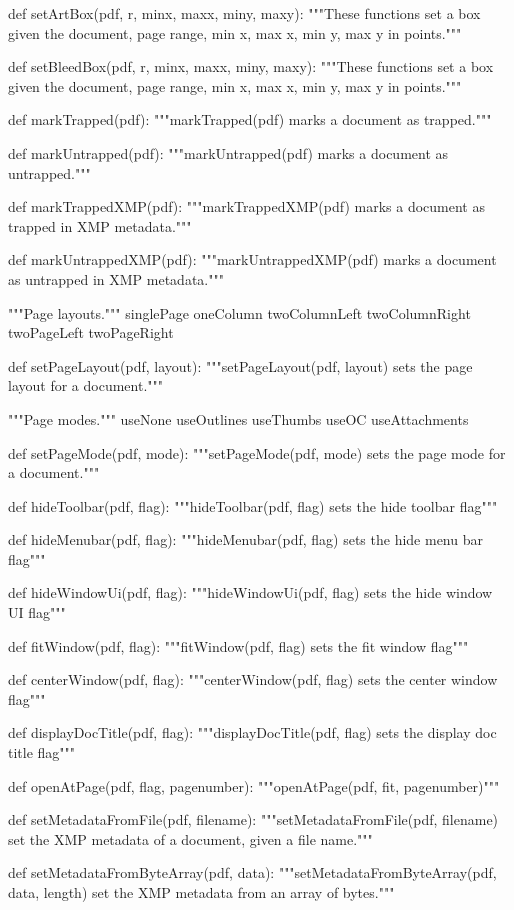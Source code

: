 def setArtBox(pdf, r, minx, maxx, miny, maxy):
    """These functions set a box given the document, page range, min x, max x,
    min y, max y in points."""

def setBleedBox(pdf, r, minx, maxx, miny, maxy):
    """These functions set a box given the document, page range, min x, max x,
    min y, max y in points."""

def markTrapped(pdf):
    """markTrapped(pdf) marks a document as trapped."""

def markUntrapped(pdf):
    """markUntrapped(pdf) marks a document as untrapped."""

def markTrappedXMP(pdf):
    """markTrappedXMP(pdf) marks a document as trapped in XMP metadata."""

def markUntrappedXMP(pdf):
    """markUntrappedXMP(pdf) marks a document as untrapped in XMP metadata."""

"""Page layouts."""
singlePage
oneColumn
twoColumnLeft
twoColumnRight
twoPageLeft
twoPageRight

def setPageLayout(pdf, layout):
    """setPageLayout(pdf, layout) sets the page layout for a document."""

"""Page modes."""
useNone
useOutlines
useThumbs
useOC
useAttachments


def setPageMode(pdf, mode):
    """setPageMode(pdf, mode) sets the page mode for a document."""

def hideToolbar(pdf, flag):
    """hideToolbar(pdf, flag) sets the hide toolbar flag"""

def hideMenubar(pdf, flag):
    """hideMenubar(pdf, flag) sets the hide menu bar flag"""

def hideWindowUi(pdf, flag):
    """hideWindowUi(pdf, flag) sets the hide window UI flag"""

def fitWindow(pdf, flag):
    """fitWindow(pdf, flag) sets the fit window flag"""

def centerWindow(pdf, flag):
    """centerWindow(pdf, flag) sets the center window flag"""

def displayDocTitle(pdf, flag):
    """displayDocTitle(pdf, flag) sets the display doc title flag"""

def openAtPage(pdf, flag, pagenumber):
    """openAtPage(pdf, fit, pagenumber)"""

def setMetadataFromFile(pdf, filename):
    """setMetadataFromFile(pdf, filename) set the XMP metadata of a document,
    given a file name."""

def setMetadataFromByteArray(pdf, data):
    """setMetadataFromByteArray(pdf, data, length) set the XMP metadata from
    an array of bytes."""

